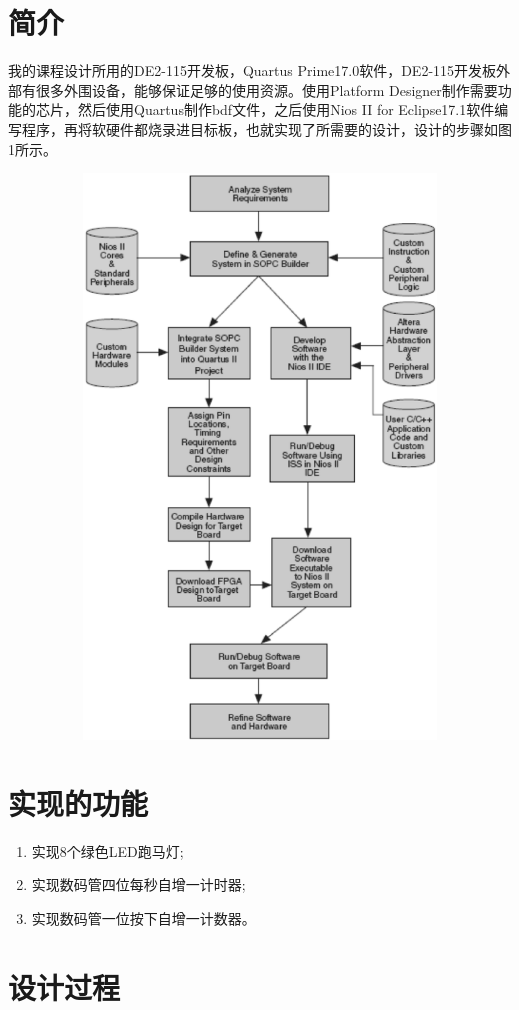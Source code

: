 \documentclass[UTF8]{ctexart}
\makeatletter
\newcommand{\figcaption}{\def\@captype{figure}\caption}
\makeatother
\begin{document}
\section{简介}
我的课程设计所用的DE2-115开发板，Quartus Prime17.0软件，DE2-115开发板外部有很多外围设备，能够保证足够的使用资源。使用Platform Designer制作需要功能的芯片，然后使用Quartus制作bdf文件，之后使用Nios II for Eclipse17.1软件编写程序，再将软硬件都烧录进目标板，也就实现了所需要的设计，设计的步骤如图1所示。
\begin{center}
	\includegraphics[width=14cm,height=15cm]{flow.eps}
	\figcaption{设计流程图}\label{flow}
\end{center}
\section{实现的功能}
\begin{enumerate}
	\item 实现8个绿色LED跑马灯;
	\item 实现数码管四位每秒自增一计时器;
	\item 实现数码管一位按下自增一计数器。
\end{enumerate}

\section{设计过程}
\end{document}
